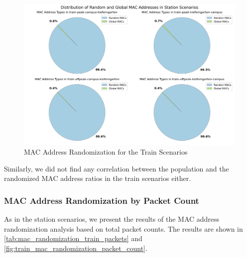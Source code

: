 \documentclass[sigconf,nonacm]{acmart}
\begin{document}
\begin{figure}
    \centering
    \includegraphics[width=\columnwidth]{images/part1/mac-address-types/train-scenarios.png}
    \caption{MAC Address Randomization for the Train Scenarios}
    \label{fig:train_mac_randomization}
\end{figure}

Similarly, we did not find any correlation between the population and the randomized MAC address ratios in the train scenarios either.

\subsubsection{MAC Address Randomization by Packet Count}
\label{sec:part-1/train/mac-randomization-packet-count}
As in the station scenarios, we present the results of the MAC address randomization analysis based on total packet counts. The results are shown in \cref{tab:mac_randomization_train_packets} and \cref{fig:train_mac_randomization_packet_count}.

\begin{table}[ht]
    \centering
    \caption{Packet-based MAC Address Randomization Ratios in Train Scenarios}
    \label{tab:mac_randomization_train_packets}
\end{table}
\end{document}
